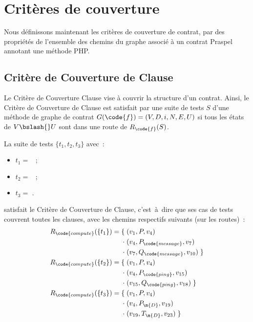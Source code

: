 \section{Critères de couverture}
\label{section:test:criteria}

Nous définissons maintenant les critères de couverture de contrat, par des
propriétés de l'ensemble des chemins du graphe associé à un contrat Praspel
annotant une méthode PHP.

\subsection{Critère de Couverture de Clause}

Le Critère de Couverture Clause vise à couvrir la structure d'un contrat. Ainsi,
le Critère de Couverture de Clause est satisfait par une suite de tests $S$
d'une méthode  de graphe de contrat $G(\code{f}) = (V, D, i, N, E, U)$
si tous les états de $V \bslash{}U$ sont dans une route de $R_\code{f}(S)$.

\begin{example}

La suite de tests $\{t_1, t_2, t_3\}$ avec~:
%
\begin{itemize}

\item
$t_1 =$ ~;

\item
$t_2 =$ ~;

\item
$t_3 =$ .

\end{itemize}
%
satisfait le Critère de Couverture de Clause, c'est~à~dire que ses cas de tests
couvrent toutes les clauses, avec les chemins respectifs suivants (sur les
routes)~:
%
\begin{align*}
%
R_\code{compute}(\{t_1\}) = \{\;
          & (v_1, P, v_4) \\
  \cdot\; & (v_4, P_\code{message}, v_7) \\
  \cdot\; & (v_7, Q_\code{message}, v_{10}) \;\} \\
%
R_\code{compute}(\{t_2\}) = \{\;
          & (v_1, P, v_4) \\
  \cdot\; & (v_4, P_\code{ping}, v_{15}) \\
  \cdot\; & (v_{15}, Q_\code{ping}, v_{18}) \;\} \\
%
R_\code{compute}(\{t_3\}) = \{\;
          & (v_1, P, v_4) \\
  \cdot\; & (v_4, P_\m{D}, v_{19}) \\
  \cdot\; & (v_{19}, T_\m{D}, v_{23}) \;\}
%
\end{align*}

\end{example}

